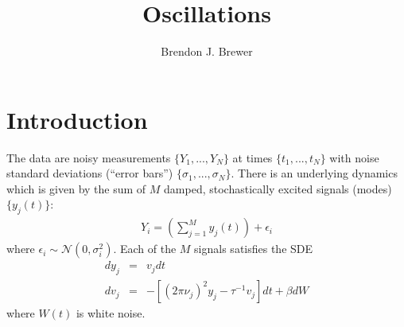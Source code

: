 \documentclass[letterpaper, 11pt]{article}
\title{Oscillations}
\author{Brendon J. Brewer}
\begin{document}
\maketitle

\section{Introduction}
The data are noisy measurements $\{Y_1, ..., Y_N\}$ at times
$\{t_1, ..., t_N\}$ with noise standard deviations (``error bars'')
$\{\sigma_1, ..., \sigma_N\}$. There is an underlying dynamics which is
given by the sum of $M$ damped, stochastically excited signals (modes)
$\{y_j(t)\}$:
\begin{eqnarray}
Y_i = \left(\sum_{j=1}^M y_j(t)\right) + \epsilon_i
\end{eqnarray}
where $\epsilon_i \sim \mathcal{N}(0, \sigma_i^2)$.
Each of the $M$ signals satisfies the SDE
\begin{eqnarray}
dy_j &=& v_j dt\\
dv_j &=& -\left[(2\pi\nu_j)^2y_j - \tau^{-1}v_j\right]dt + \beta dW
\end{eqnarray}
where $W(t)$ is white noise.
\end{document}
